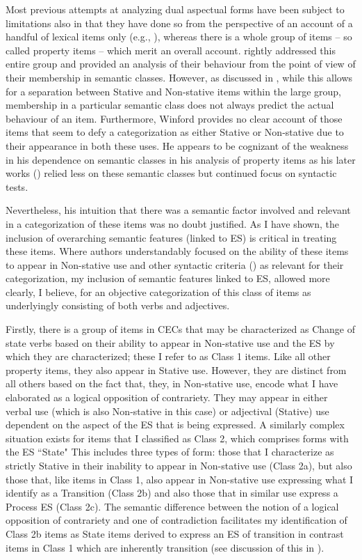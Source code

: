 Most previous attempts at analyzing dual aspectual forms have been subject to limitations also in that they have done so from the perspective of an account of a handful of lexical items only (e.g., \citealt{Sebba1986,Seuren1986}), whereas there is a whole group of items -- so called property items -- which merit an overall account. \citet{Winford1993} rightly addressed this entire group and provided an analysis of their behaviour from the point of view of their membership in semantic classes. However, as discussed in , while this allows for a separation between Stative and Non-stative items within the large group, membership in a particular semantic class does not always predict the actual behaviour of an item. Furthermore, Winford provides no clear account of those items that seem to defy a categorization as either Stative or Non-stative due to their appearance in both these uses. He appears to be cognizant of the weakness in his dependence on semantic classes in his analysis of property items as his later works (\citeyear{Winford1997,Winford2001}) relied less on these semantic classes but continued focus on syntactic tests. 

Nevertheless, his intuition that there was a semantic factor involved and relevant in a categorization of these items was no doubt justified. As I have shown, the inclusion of overarching semantic features (linked to ES) is critical in treating these items. Where authors understandably focused on the ability of these items to appear in Non-stative use and other syntactic criteria () as relevant for their categorization, my inclusion of semantic features linked to ES, allowed more clearly, I believe, for an objective categorization of this class of items as underlyingly consisting of both verbs and adjectives. 

Firstly, there is a group of items in CECs that may be characterized as Change of state verbs based on their ability to appear in Non-stative use and the ES by which they are characterized; these I refer to as Class 1 items. Like all other property items, they also appear in Stative use. However, they are distinct from all others based on the fact that, they, in Non-stative use, encode what I have elaborated as a logical opposition of contrariety. They may appear in either verbal use (which is also Non-stative in this case) or adjectival (Stative) use dependent on the aspect of the ES that is being expressed. A similarly complex situation exists for items that I classified as Class 2, which comprises forms with the ES ``State" This includes three types of form: those that I characterize as strictly Stative in their inability to appear in Non-stative use (Class 2a), but also those that, like items in Class 1, also appear in Non-stative use expressing what I identify as a Transition (Class 2b) and also those that in similar use express a Process ES (Class 2c). The semantic difference between the notion of a logical opposition of contrariety and one of contradiction facilitates my identification of Class 2b items as State items derived to express an ES of transition in contrast items in Class 1 which are inherently transition (see discussion of this in ).

